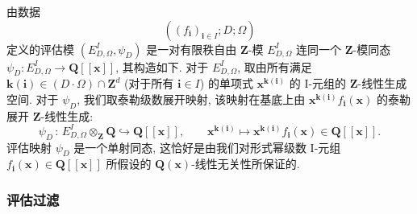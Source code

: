 \begin{definition}\label{def:3.1.2}
由数据
\[ \left( (f_{\mathbf{i}})_{\mathbf{i}\in I}; D; \Omega \right) \]
定义的评估模 \((E_{D,\Omega}^I, \psi_D)\) 是一对有限秩自由 \(\mathbf{Z}\)-模 \(E_{D,\Omega}^I\) 连同一个 \(\mathbf{Z}\)-模同态 \(\psi_D: E_{D,\Omega}^I \to \mathbf{Q}[\![\mathbf{x}]\!]\), 其构造如下. 
对于 \(E_{D,\Omega}^I\), 取由所有满足 \(\mathbf{k}(\mathbf{i}) \in (D \cdot \Omega) \cap \mathbf{Z}^d\) (对于所有 \(\mathbf{i} \in I\)) 的单项式 \(\mathbf{x}^{\mathbf{k}(\mathbf{i})}\) 的 I-元组的 \(\mathbf{Z}\)-线性生成空间. 
对于 \(\psi_D\), 我们取泰勒级数展开映射, 该映射在基底上由 \(\mathbf{x}^{\mathbf{k}(\mathbf{i})}f_{\mathbf{i}}(\mathbf{x})\) 的泰勒展开 \(\mathbf{Z}\)-线性生成:
\[ \psi_D\,:\,E_{D,\Omega}^I\otimes_{\mathbf{Z}}\mathbf{Q}\hookrightarrow\mathbf{Q}[\![\mathbf{x}]\!],\qquad\mathbf{x}^{\mathbf{k}(\mathbf{i})}\mapsto\mathbf{x}^{\mathbf{k}(\mathbf{i})}f_{\mathbf{i}}(\mathbf{x})\in\mathbf{Q}[\![\mathbf{x}]\!]. \]
评估映射 \(\psi_D\) 是一个单射同态, 这恰好是由我们对形式幂级数 I-元组 \(f_{\mathbf{i}}(\mathbf{x}) \in \mathbf{Q}[\![\mathbf{x}]\!]\) 所假设的 \(\mathbf{Q}(\mathbf{x})\)-线性无关性所保证的.
\end{definition}

\subsubsection{评估过滤}\label{sec:3.1.3}

